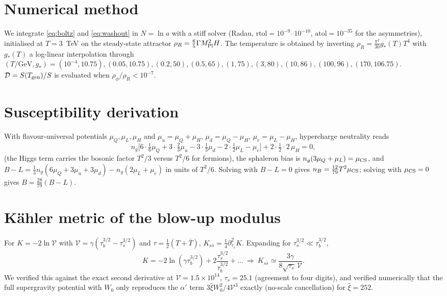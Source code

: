 \documentclass[11pt]{article}
\newcommand{\MP}{M_{\rm Pl}}
\newcommand{\Tgen}{T_{\rm gen}}
\begin{document}
\appendix
\section{Numerical method}\label{app:num}
We integrate \eqref{eq:boltz} and \eqref{eq:washout} in $N=\ln a$ with a stiff solver (Radau, $\mathrm{rtol}=10^{-9}$--$10^{-10}$, $\mathrm{atol}=10^{-35}$ for the asymmetries), initialised at $T=3$~TeV on the steady-state attractor $\rho_R=\tfrac65\Gamma\MP^2H$. The temperature is obtained by inverting $\rho_R=\frac{\pi^2}{30}g_*(T)T^4$ with $g_*(T)$ a log-linear interpolation through $(T/\text{GeV},g_*)=(10^{-4},10.75),(0.05,10.75),(0.2,50),(0.5,65),(1,75),(3,80),(10,86),(100,96),(170,106.75)$. $\mathcal D=S(\Tgen)/S$ is evaluated when $\rho_\phi/\rho_R<10^{-7}$.

\section{Susceptibility derivation}\label{app:xi}
With flavour-universal potentials $\mu_Q,\mu_L,\mu_H$ and $\mu_u=\mu_Q+\mu_H$, $\mu_d=\mu_Q-\mu_H$, $\mu_e=\mu_L-\mu_H$, hypercharge neutrality reads
\begin{equation}
n_g\Big[6\cdot\tfrac16\mu_Q+3\cdot\tfrac23\mu_u-3\cdot\tfrac13\mu_d-2\cdot\tfrac12\mu_L-\mu_e\Big]+2\cdot\tfrac12\cdot2\,\mu_H=0,
\end{equation}
(the Higgs term carries the bosonic factor $T^2/3$ versus $T^2/6$ for fermions), the sphaleron bias is $n_g(3\mu_Q+\mu_L)=\mu_{\rm CS}$, and $B-L=\tfrac13n_g(6\mu_Q+3\mu_u+3\mu_d)-n_g(2\mu_L+\mu_e)$ in units of $T^2/6$. Solving with $B-L=0$ gives $n_B=\tfrac{12}{79}T^2\mu_{\rm CS}$; solving with $\mu_{\rm CS}=0$ gives $B=\tfrac{28}{79}(B-L)$.

\section{Kähler metric of the blow-up modulus}\label{app:K}
For $K=-2\ln\mathcal V$ with $\mathcal V=\gamma(\tau_b^{3/2}-\tau_s^{3/2})$ and $\tau=\tfrac12(T+\bar T)$, $K_{s\bar s}=\tfrac14\partial_{\tau_s}^2K$. Expanding for $\tau_s^{3/2}\ll\tau_b^{3/2}$,
\begin{equation}
K=-2\ln(\gamma\tau_b^{3/2})+2\frac{\tau_s^{3/2}}{\tau_b^{3/2}}+\dots\ \Rightarrow\ K_{s\bar s}\simeq\frac{3\gamma}{8\sqrt{\tau_s}\,\mathcal V}.
\end{equation}
We verified this against the exact second derivative at $\mathcal V=1.5\times10^{14}$, $\tau_s=25.1$ (agreement to four digits), and verified numerically that the full supergravity potential with $W_0$ only reproduces the $\alpha'$ term $3\hat\xi W_0^2/4\mathcal V^3$ exactly (no-scale cancellation) for $\hat\xi=252$.
\end{document}
